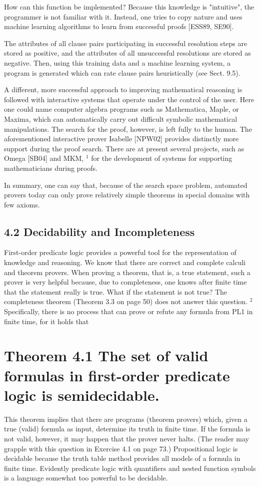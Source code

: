 \documentclass[10pt]{book}
\begin{document}
How can this function be implemented? Because this knowledge is "intuitive", the programmer is not familiar with it. Instead, one tries to copy nature and uses machine learning algorithms to learn from successful proofs [ESS89, SE90].

The attributes of all clause pairs participating in successful resolution steps are stored as positive, and the attributes of all unsuccessful resolutions are stored as negative. Then, using this training data and a machine learning system, a program is generated which can rate clause pairs heuristically (see Sect. 9.5).

A different, more successful approach to improving mathematical reasoning is followed with interactive systems that operate under the control of the user. Here one could name computer algebra programs such as Mathematica, Maple, or Maxima, which can automatically carry out difficult symbolic mathematical manipulations. The search for the proof, however, is left fully to the human. The aforementioned interactive prover Isabelle [NPW02] provides distinctly more support during the proof search. There are at present several projects, such as Omega [SB04] and MKM, ${ }^{1}$ for the development of systems for supporting mathematicians during proofs.

In summary, one can say that, because of the search space problem, automated provers today can only prove relatively simple theorems in special domains with few axioms.

\subsection*{4.2 Decidability and Incompleteness}
First-order predicate logic provides a powerful tool for the representation of knowledge and reasoning. We know that there are correct and complete calculi and theorem provers. When proving a theorem, that is, a true statement, such a prover is very helpful because, due to completeness, one knows after finite time that the statement really is true. What if the statement is not true? The completeness theorem (Theorem 3.3 on page 50) does not answer this question. ${ }^{2}$ Specifically, there is no process that can prove or refute any formula from PL1 in finite time, for it holds that

\section*{Theorem 4.1 The set of valid formulas in first-order predicate logic is semidecidable.}
This theorem implies that there are programs (theorem provers) which, given a true (valid) formula as input, determine its truth in finite time. If the formula is not valid, however, it may happen that the prover never halts. (The reader may grapple with this question in Exercise 4.1 on page 73.) Propositional logic is decidable because the truth table method provides all models of a formula in finite time. Evidently predicate logic with quantifiers and nested function symbols is a language somewhat too powerful to be decidable.
\end{document}
